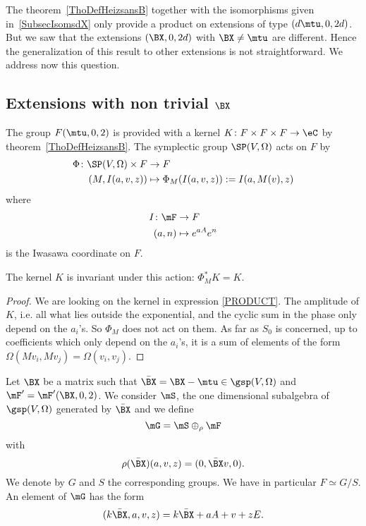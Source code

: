 The theorem~\ref{ThoDefHeizsansB} together with the isomorphisms given in~\ref{SubsecIsomsdX} only provide a product on extensions of type $(d\mtu,0,2d)$. But we saw that the extensions $(\BX ,0,2d)$ with $\BX \neq\mtu$ are different. Hence the generalization of this result to other extensions is not straightforward. We address now this question.

\subsection{Extensions with non trivial \texorpdfstring{$\protect\BX $}{X}} \label{subsecTrick}

The group $F(\mtu,0,2)$ is provided with a kernel $K\colon F\times F\times F\to \eC$ by theorem~\ref{ThoDefHeizsansB}.  The symplectic group $\SP(V,\Omega)$ acts on $F$ by
\begin{equation}
\begin{aligned}
 \Phi\colon \SP(V,\Omega)\times F&\to F \\
(M,I(a,v,z))&\mapsto \Phi_{M}(I(a,v,z)):=I(a,M(v),z)
\end{aligned}
\end{equation}
where
\begin{equation}
\begin{aligned}
 I\colon \mF&\to F \\
(a,n)&\mapsto  e^{aA} e^{n}
\end{aligned}
\end{equation}
is the Iwasawa coordinate on $F$.

\begin{proposition}
The kernel $K$ is invariant under this action: $\Phi^*_{M}K=K$.
 \label{PropkernelinvarSp}
\end{proposition}

\begin{proof}
We are looking on the kernel in expression \eqref{PRODUCT}. The amplitude of $K$, i.e. all what lies outside the exponential, and the cyclic sum in the phase only depend on the $a_{i}$'s. So $\Phi_{M}$ does not act on them. As far as $S_{0}$ is concerned, up to coefficients which only depend on the $a_{i}$'s, it is a sum of elements of the form $\Omega(Mv_{i},Mv_{j})=\Omega(v_{i},v_{j})$.
\end{proof}

Let $\BX $ be a matrix such that $\bar{\BX }=\BX -\mtu\in\gsp(V,\Omega)$ and $\mF'=\mF'(\BX,0,2)$. We consider $\mS$, the one dimensional subalgebra of $\gsp(V,\Omega)$ generated by $\bar{\BX}$ and we define
\begin{equation}
  \mG=\mS\oplus_{\rho}\mF
\end{equation}
with
\[
  \rho(\bar{\BX })(a,v,z)=(0,\bar{\BX }v,0).
\]
We denote by $G$ and $S$ the corresponding groups. We have in particular $F\simeq G/S$. An element of $\mG$ has the form
\begin{equation}    \label{EqDefkavzG}
  (k\bar\BX,a,v,z)=k\bar\BX+aA+v+zE.
\end{equation}


